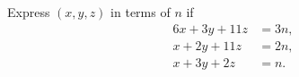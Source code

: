 Express $(x,y,z)$ in terms of $n$ if
\begin{align*}
6x+3y+11z&=3n,\\
x+2y+11z&=2n,\\
x+3y+2z&=n.
\end{align*}
